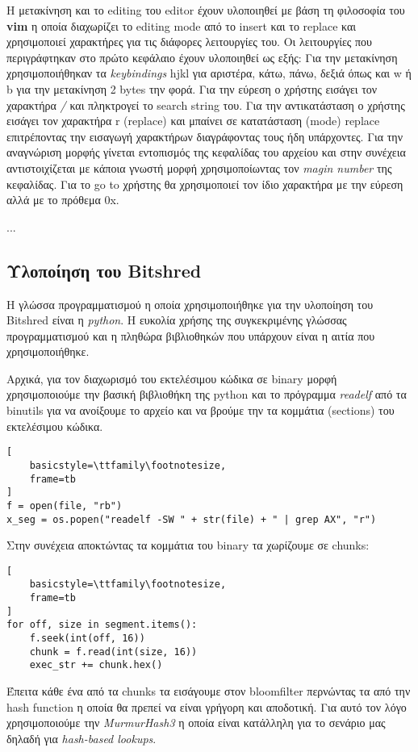 \pagebreak
Η μετακίνηση και το editing του editor έχουν υλοποιηθεί με βάση τη φιλοσοφία του \textbf{vim} η οποία διαχωρίζει το editing mode από το insert και το replace και χρησιμοποιεί χαρακτήρες για τις διάφορες λειτουργίες του.
Οι λειτουργίες που περιγράφτηκαν στο πρώτο κεφάλαιο έχουν υλοποιηθεί ως εξής:
Για την μετακίνηση χρησιμοποιήθηκαν τα \emph{keybindings} hjkl για αριστέρα, κάτω, πάνω, δεξιά όπως και w ή b για την μετακίνηση 2 bytes την φορά.
Για την εύρεση ο χρήστης εισάγει τον χαρακτήρα \emph{/} και πληκτρογεί το search string του.
Για την αντικατάσταση ο χρήστης εισάγει τον χαρακτήρα r (replace) και μπαίνει σε κατατάσταση (mode) replace επιτρέποντας την εισαγωγή χαρακτήρων διαγράφοντας τους ήδη υπάρχοντες.
Για την αναγνώριση μορφής γίνεται εντοπισμός της κεφαλίδας του αρχείου και στην συνέχεια αντιστοιχίζεται με κάποια γνωστή μορφή χρησιμοποίωντας τον \emph{magin number} της κεφαλίδας.
Για το go to χρήστης θα χρησιμοποιεί τον ίδιο χαρακτήρα με την εύρεση αλλά με το πρόθεμα 0x.

...

\pagebreak
\subsection{Υλοποίηση του Bitshred}
Η γλώσσα προγραμματισμού η οποία χρησιμοποιήθηκε για την υλοποίηση του Bitshred είναι η \emph{python}.
Η ευκολία χρήσης της συγκεκριμένης γλώσσας προγραμματισμού και η πληθώρα βιβλιοθηκών που υπάρχουν  είναι η αιτία που χρησιμοποιήθηκε.

Αρχικά, για τον διαχωρισμό του εκτελέσιμου κώδικα σε binary μορφή χρησιμοποιούμε την βασική βιβλιοθήκη της python και το πρόγραμμα \emph{readelf} από τα binutils για να ανοίξουμε το αρχείο και να βρούμε την τα κομμάτια (sections) του εκτελέσιμου κώδικα.
\begin{lstlisting}[
    basicstyle=\ttfamily\footnotesize,
    frame=tb
]
f = open(file, "rb")
x_seg = os.popen("readelf -SW " + str(file) + " | grep AX", "r")
\end{lstlisting}

Στην συνέχεια αποκτώντας τα κομμάτια του binary τα χωρίζουμε σε chunks:
\begin{lstlisting}[
    basicstyle=\ttfamily\footnotesize,
    frame=tb
]
for off, size in segment.items():
    f.seek(int(off, 16))
    chunk = f.read(int(size, 16))
    exec_str += chunk.hex()
\end{lstlisting}

Έπειτα κάθε ένα από τα chunks τα εισάγουμε στον bloomfilter περνώντας τα από την hash function η οποία θα πρεπεί να είναι γρήγορη και αποδοτική.
Για αυτό τον λόγο χρησιμοποιούμε την \emph{MurmurHash3} η οποία είναι κατάλληλη για το σενάριο μας δηλαδή για \emph{hash-based lookups}.

